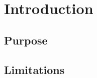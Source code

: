 \documentclass[ExampleMasters.tex]{subfiles}
\begin{document}
\chapter{Introduction}
\lipsum
\lipsum
\lipsum
\lipsum

\section{Purpose}
\lipsum

\section{Limitations}
\lipsum
\end{document}
